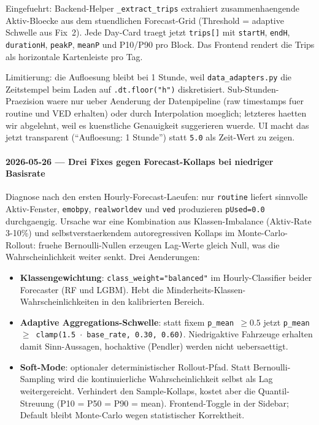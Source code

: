 Eingefuehrt: Backend-Helper \texttt{\_extract\_trips} extrahiert
zusammenhaengende Aktiv-Bloecke aus dem stuendlichen Forecast-Grid
(Threshold = adaptive Schwelle aus Fix~2). Jede Day-Card traegt jetzt
\texttt{trips[]} mit \texttt{startH}, \texttt{endH}, \texttt{durationH},
\texttt{peakP}, \texttt{meanP} und P10/P90 pro Block. Das Frontend rendert
die Trips als horizontale Kartenleiste pro Tag.

Limitierung: die Aufloesung bleibt bei 1 Stunde, weil
\texttt{data\_adapters.py} die Zeitstempel beim Laden auf \texttt{.dt.floor("h")}
diskretisiert. Sub-Stunden-Praezision waere nur ueber Aenderung der
Datenpipeline (raw timestamps fuer routine und VED erhalten) oder durch
Interpolation moeglich; letzteres haetten wir abgelehnt, weil es kuenstliche
Genauigkeit suggerieren wuerde. UI macht das jetzt transparent
(``Aufloesung: 1 Stunde'') statt \texttt{5.0} als Zeit-Wert zu zeigen.

\paragraph{2026-05-26 --- Drei Fixes gegen Forecast-Kollaps bei niedriger Basisrate}
Diagnose nach den ersten Hourly-Forecast-Laeufen: nur \texttt{routine}
liefert sinnvolle Aktiv-Fenster, \texttt{emobpy}, \texttt{realworldev} und
\texttt{ved} produzieren \texttt{pUsed=0.0} durchgaengig. Ursache war eine
Kombination aus Klassen-Imbalance (Aktiv-Rate 3-10\%) und
selbstverstaerkendem autoregressiven Kollaps im Monte-Carlo-Rollout: fruehe
Bernoulli-Nullen erzeugen Lag-Werte gleich Null, was die Wahrscheinlichkeit
weiter senkt. Drei Aenderungen:

\begin{itemize}
\item \textbf{Klassengewichtung}: \texttt{class\_weight="balanced"} im
  Hourly-Classifier beider Forecaster (RF und LGBM). Hebt die
  Minderheits-Klassen-Wahrscheinlichkeiten in den kalibrierten Bereich.
\item \textbf{Adaptive Aggregations-Schwelle}: statt fixem
  \texttt{p\_mean $\geq 0.5$} jetzt \texttt{p\_mean $\geq$ clamp(1.5
  $\cdot$ base\_rate, 0.30, 0.60)}. Niedrigaktive Fahrzeuge erhalten
  damit Sinn-Aussagen, hochaktive (Pendler) werden nicht uebersaettigt.
\item \textbf{Soft-Mode}: optionaler deterministischer Rollout-Pfad. Statt
  Bernoulli-Sampling wird die kontinuierliche Wahrscheinlichkeit selbst als
  Lag weitergereicht. Verhindert den Sample-Kollaps, kostet aber die
  Quantil-Streuung (P10 = P50 = P90 = mean). Frontend-Toggle in der
  Sidebar; Default bleibt Monte-Carlo wegen statistischer Korrektheit.
\end{itemize}


